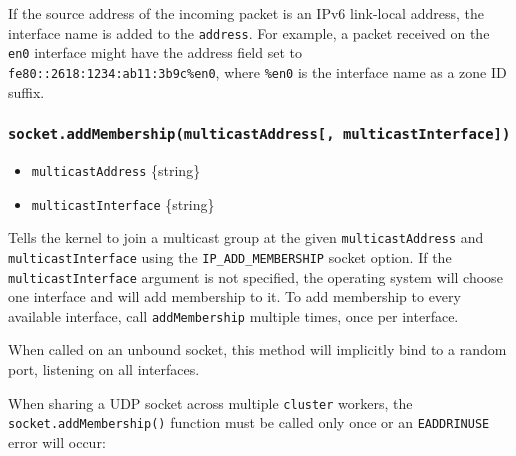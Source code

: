 If the source address of the incoming packet is an IPv6 link-local
address, the interface name is added to the \texttt{address}. For
example, a packet received on the \texttt{en0} interface might have the
address field set to
\texttt{\textquotesingle{}fe80::2618:1234:ab11:3b9c\%en0\textquotesingle{}},
where \texttt{\textquotesingle{}\%en0\textquotesingle{}} is the
interface name as a zone ID suffix.

\subsubsection{\texorpdfstring{\texttt{socket.addMembership(multicastAddress{[},\ multicastInterface{]})}}{socket.addMembership(multicastAddress{[}, multicastInterface{]})}}\label{socket.addmembershipmulticastaddress-multicastinterface}

\begin{itemize}
\tightlist
\item
  \texttt{multicastAddress} \{string\}
\item
  \texttt{multicastInterface} \{string\}
\end{itemize}

Tells the kernel to join a multicast group at the given
\texttt{multicastAddress} and \texttt{multicastInterface} using the
\texttt{IP\_ADD\_MEMBERSHIP} socket option. If the
\texttt{multicastInterface} argument is not specified, the operating
system will choose one interface and will add membership to it. To add
membership to every available interface, call \texttt{addMembership}
multiple times, once per interface.

When called on an unbound socket, this method will implicitly bind to a
random port, listening on all interfaces.

When sharing a UDP socket across multiple \texttt{cluster} workers, the
\texttt{socket.addMembership()} function must be called only once or an
\texttt{EADDRINUSE} error will occur:

